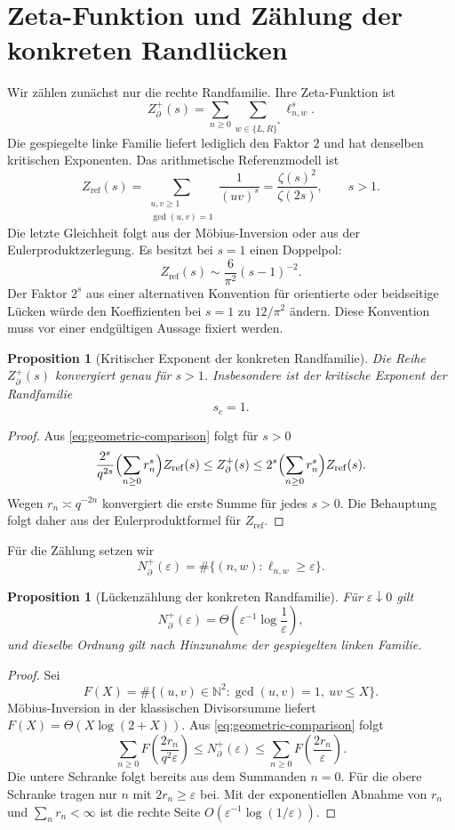 \documentclass[11pt,a4paper]{article}
\newcommand{\N}{\mathbb{N}}
\newtheorem{proposition}[remark]{Proposition}
\begin{document}
\section{Zeta-Funktion und Zählung der konkreten Randlücken}

Wir zählen zunächst nur die rechte Randfamilie. Ihre Zeta-Funktion ist
\[
 Z_\partial^+(s)=
 \sum_{n\ge0}\sum_{w\in\{L,R\}^*}\ell_{n,w}^s.
\]
Die gespiegelte linke Familie liefert lediglich den Faktor $2$ und hat
denselben kritischen Exponenten. Das arithmetische Referenzmodell ist
\[
 Z_{\mathrm{ref}}(s)
 =\sum_{\substack{u,v\ge1\\\gcd(u,v)=1}}\frac{1}{(uv)^s}
 =\frac{\zeta(s)^2}{\zeta(2s)},\qquad s>1.
\]
Die letzte Gleichheit folgt aus der Möbius-Inversion oder aus der
Eulerproduktzerlegung. Es besitzt bei $s=1$ einen Doppelpol:
\[
 Z_{\mathrm{ref}}(s)\sim\frac{6}{\pi^2}(s-1)^{-2}.
\]
Der Faktor $2^s$ aus einer alternativen Konvention für orientierte oder
beidseitige Lücken würde den Koeffizienten bei $s=1$ zu $12/\pi^2$
ändern. Diese Konvention muss vor einer endgültigen Aussage fixiert
werden.

\begin{proposition}[Kritischer Exponent der konkreten Randfamilie]
Die Reihe $Z_\partial^+(s)$ konvergiert genau für $s>1$. Insbesondere ist
der kritische Exponent der Randfamilie
\[
 s_c=1.
\]
\end{proposition}

\begin{proof}
Aus \eqref{eq:geometric-comparison} folgt für $s>0$
\[
 \frac{2^s}{q^{2s}}\Bigl(\sum_{n\ge0}r_n^s\Bigr)Z_{\mathrm{ref}}(s)
 \le Z_\partial^+(s)\le
 2^s\Bigl(\sum_{n\ge0}r_n^s\Bigr)Z_{\mathrm{ref}}(s).
\]
Wegen $r_n\asymp q^{-2n}$ konvergiert die erste Summe für jedes $s>0$.
Die Behauptung folgt daher aus der Eulerproduktformel für
$Z_{\mathrm{ref}}$.
\end{proof}

Für die Zählung setzen wir
\[
 N_\partial^+(\varepsilon)=
 \#\{(n,w):\ell_{n,w}\ge\varepsilon\}.
\]

\begin{proposition}[Lückenzählung der konkreten Randfamilie]
Für $\varepsilon\downarrow0$ gilt
\[
 N_\partial^+(\varepsilon)=\Theta\!\left(
 \varepsilon^{-1}\log\frac1\varepsilon\right),
\]
und dieselbe Ordnung gilt nach Hinzunahme der gespiegelten linken Familie.
\end{proposition}

\begin{proof}
Sei
\[
 F(X)=\#\{(u,v)\in\N^2:\gcd(u,v)=1,\ uv\le X\}.
\]
Möbius-Inversion in der klassischen Divisorsumme liefert
$F(X)=\Theta(X\log(2+X))$. Aus \eqref{eq:geometric-comparison} folgt
\[
 \sum_{n\ge0}F\!\left(\frac{2r_n}{q^2\varepsilon}\right)
 \le N_\partial^+(\varepsilon)\le
 \sum_{n\ge0}F\!\left(\frac{2r_n}{\varepsilon}\right).
\]
Die untere Schranke folgt bereits aus dem Summanden $n=0$. Für die obere
Schranke tragen nur $n$ mit $2r_n\ge\varepsilon$ bei. Mit der exponentiellen
Abnahme von $r_n$ und $\sum_n r_n<\infty$ ist die rechte Seite
$O(\varepsilon^{-1}\log(1/\varepsilon))$.
\end{proof}
\end{document}
